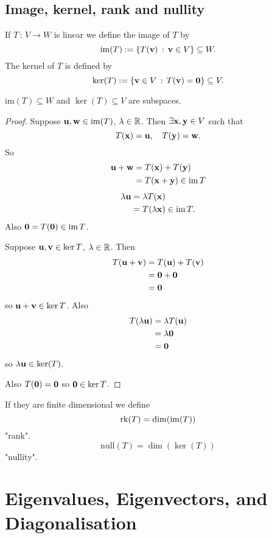 \documentclass[10pt, a4paper]{article}
\begin{document}
\subsection{Image, kernel, rank and nullity}
\begin{definition}
    If $T\,:\, V \rightarrow W$ is linear we define the image of $T$ by
    \[
    \mathrm{im}(T) := \{T(\mathbf{v})\,:\,\mathbf{v} \in V\} \subseteq W.
    \]
    The kernel of $T$ is defined by
    \[
    \ker(T) := \{\mathbf{v} \in V\,:\,T(\mathbf{v}) = \mathbf{0}\} \subseteq V.
    \]
\end{definition}

\begin{proposition}
    $\mathrm{im}(T) \subseteq W$ and $\ker(T) \subseteq V$ are subspaces.
    \begin{proof}
        Suppose $\mathbf{u, w} \in \mathrm{im}(T)$,
        $\lambda \in \mathbb{R}$.
        Then $\exists \mathbf{x, y} \in V$ such that
        \[
        T(\mathbf{x}) = \mathbf{u},\quad T(\mathbf{y}) = \mathbf{w}.
        \]
        So
        \begin{align*}
            \mathbf{u} + \mathbf{w} &= T(\mathbf{x}) + T(\mathbf{y}) \\
            &= T(\mathbf{x} + \mathbf{y}) \in \operatorname{im}{T}
        \end{align*}
        \begin{align*}
            \lambda\mathbf{u} &= \lambda T(\mathbf{x}) \\
            &= T(\lambda\mathbf{x}) \in \operatorname{im}{T}.
        \end{align*}
        Also $\mathbf{0} = T(\mathbf{0}) \in \operatorname{im}{T}$.

        Suppose $\mathbf{u, v} \in \ker{T}$,
        $\lambda \in \mathbb{R}$.
        Then
        \begin{align*}
            T(\mathbf{u} + \mathbf{v}) &= T(\mathbf{u}) + T(\mathbf{v}) \\
            &= \mathbf{0} + \mathbf{0} \\
            &= \mathbf{0}
        \end{align*}
        so $\mathbf{u + v} \in \ker{T}$.
        Also
        \begin{align*}
            T(\lambda\mathbf{u}) &= \lambda T(\mathbf{u}) \\
            &= \lambda\mathbf{0} \\
            &= \mathbf{0}
        \end{align*}
        so $\lambda\mathbf{u} \in \ker(T)$.

        Also $T(\mathbf{0}) = \mathbf{0}$ so $\mathbf{0} \in \ker{T}$.
    \end{proof}
\end{proposition}

\begin{definition}
    If they are finite dimensional we define
    \[
    \mathrm{rk}(T) = \dim(\operatorname{im}(T))
    \]
    "rank".
    \[
    \mathrm{null}(T) = \dim(\ker(T))
    \]
    "nullity".
\end{definition}

\newpage

\section{Eigenvalues, Eigenvectors, and Diagonalisation}
\end{document}
